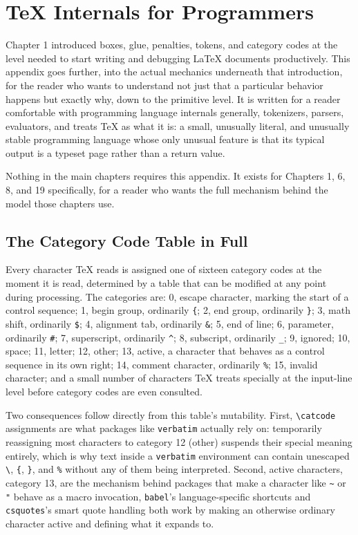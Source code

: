 \hypertarget{appendix-a-tex-internals-for-programmers}{%
\chapter{TeX Internals for Programmers}\label{appendix-a-tex-internals-for-programmers}}

Chapter 1 introduced boxes, glue, penalties, tokens, and category codes at the level needed to start writing and debugging LaTeX documents productively. This appendix goes further, into the actual mechanics underneath that introduction, for the reader who wants to understand not just that a particular behavior happens but exactly why, down to the primitive level. It is written for a reader comfortable with programming language internals generally, tokenizers, parsers, evaluators, and treats TeX as what it is: a small, unusually literal, and unusually stable programming language whose only unusual feature is that its typical output is a typeset page rather than a return value.

Nothing in the main chapters requires this appendix. It exists for Chapters 1, 6, 8, and 19 specifically, for a reader who wants the full mechanism behind the model those chapters use.

\hypertarget{a.1-the-category-code-table-in-full}{%
\section{The Category Code Table in Full}\label{a.1-the-category-code-table-in-full}}

Every character TeX reads is assigned one of sixteen category codes at the moment it is read, determined by a table that can be modified at any point during processing. The categories are: 0, escape character, marking the start of a control sequence; 1, begin group, ordinarily \texttt{\{}; 2, end group, ordinarily \texttt{\}}; 3, math shift, ordinarily \texttt{\$}; 4, alignment tab, ordinarily \texttt{\&}; 5, end of line; 6, parameter, ordinarily \texttt{\#}; 7, superscript, ordinarily \texttt{\^{}}; 8, subscript, ordinarily \texttt{\_}; 9, ignored; 10, space; 11, letter; 12, other; 13, active, a character that behaves as a control sequence in its own right; 14, comment character, ordinarily \texttt{\%}; 15, invalid character; and a small number of characters TeX treats specially at the input-line level before category codes are even consulted.

Two consequences follow directly from this table's mutability. First, \texttt{\textbackslash{}catcode} assignments are what packages like \texttt{verbatim} actually rely on: temporarily reassigning most characters to category 12 (other) suspends their special meaning entirely, which is why text inside a \texttt{verbatim} environment can contain unescaped \texttt{\textbackslash{}}, \texttt{\{}, \texttt{\}}, and \texttt{\%} without any of them being interpreted. Second, active characters, category 13, are the mechanism behind packages that make a character like \texttt{\textasciitilde{}} or \texttt{"} behave as a macro invocation, \texttt{babel}'s language-specific shortcuts and \texttt{csquotes}'s smart quote handling both work by making an otherwise ordinary character active and defining what it expands to.

